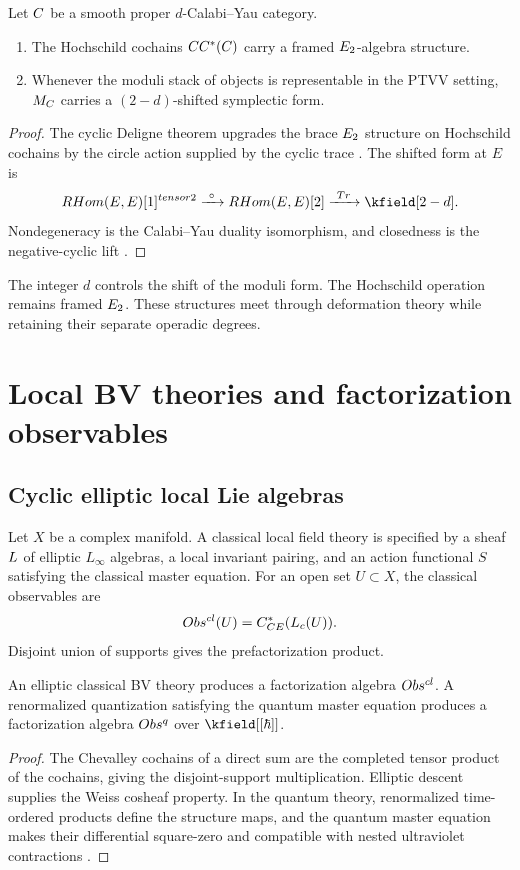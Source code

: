 \begin{theorem}
Let $C$ be a smooth proper $d$-Calabi--Yau category.
\begin{enumerate}
\item The Hochschild cochains $CC^*(C)$ carry a framed $E_2$-algebra structure.
\item Whenever the moduli stack of objects is representable in the PTVV setting, $M_{C}$ carries a $(2-d)$-shifted symplectic form.
\end{enumerate}
\end{theorem}
\begin{proof}
The cyclic Deligne theorem upgrades the brace $E_2$ structure on Hochschild cochains by the circle action supplied by the cyclic trace \cite{BravRozenblyum}. The shifted form at $E$ is
\[
 \RHom(E,E)[1]^{\tensor2}
 \xrightarrow{\ \circ\ }
 \RHom(E,E)[2]
 \xrightarrow{\ \Tr\ }
 \kfield[2-d].
\]
Nondegeneracy is the Calabi--Yau duality isomorphism, and closedness is the negative-cyclic lift \cite{PTVV,BravDyckerhoff}.
\end{proof}

The integer $d$ controls the shift of the moduli form. The Hochschild operation remains framed $E_2$. These structures meet through deformation theory while retaining their separate operadic degrees.

\chapter{Local BV theories and factorization observables}
\section{Cyclic elliptic local Lie algebras}
Let $X$ be a complex manifold. A classical local field theory is specified by a sheaf $L$ of elliptic $L_\infty$ algebras, a local invariant pairing, and an action functional $S$ satisfying the classical master equation. For an open set $U\subset X$, the classical observables are
\[
 Obs^{cl}(U)=C^*_{CE}(L_c(U)).
\]
Disjoint union of supports gives the prefactorization product.

\begin{theorem}
An elliptic classical BV theory produces a factorization algebra $Obs^{cl}$. A renormalized quantization satisfying the quantum master equation produces a factorization algebra $Obs^{q}$ over $\kfield[[\hbar]]$.
\end{theorem}
\begin{proof}
The Chevalley cochains of a direct sum are the completed tensor product of the cochains, giving the disjoint-support multiplication. Elliptic descent supplies the Weiss cosheaf property. In the quantum theory, renormalized time-ordered products define the structure maps, and the quantum master equation makes their differential square-zero and compatible with nested ultraviolet contractions \cite{CG1,CG2}.
\end{proof}

